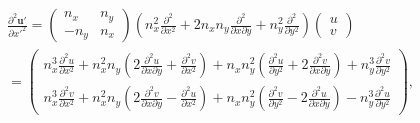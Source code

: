\documentclass[review]{elsarticle}
\begin{document}
\begin{equation}\label{du'2dx'2}
	\begin{gathered}
		\frac{\partial^2{\bm{u}'}}{\partial{x'^2}} 
			= \left(\begin{array}{cc}
				n_x & n_y \\
				-n_y & n_x
				\end{array} \right) 
			  \left(n_x^2\frac{\partial^2}{\partial x^2}+2n_xn_y\frac{\partial^2}{\partial x\partial y}
				  +n_y^2\frac{\partial^2}{\partial y^2} \right) 
	          \left(\begin{array}{c} u \\ v \end{array} \right)\\
	        = \left(\begin{array}{c}
		        n_x^3\frac{\partial^2u}{\partial x^2}
		        +n_x^2n_y\left(2\frac{\partial^2 u}{\partial x\partial y}+\frac{\partial^2 v}{\partial x^2}\right)
			    +n_xn_y^2\left(\frac{\partial^2 u}{\partial y^2}+2\frac{\partial^2 v}{\partial x\partial y}\right)
			    +n_y^3\frac{\partial^2 v}{\partial y^2}\\
			    n_x^3\frac{\partial^2v}{\partial x^2}
			    +n_x^2n_y\left(2\frac{\partial^2 v}{\partial x\partial y}-\frac{\partial^2 u}{\partial x^2}\right)
			    +n_xn_y^2\left(\frac{\partial^2 v}{\partial y^2}-2\frac{\partial^2 u}{\partial x\partial y}\right)
			    -n_y^3\frac{\partial^2 u}{\partial y^2}
	        \end{array}
	        \right),
	\end{gathered}
\end{equation}
\end{document}
